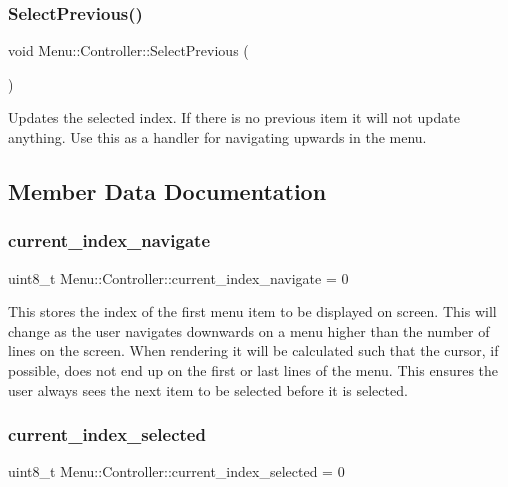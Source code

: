 \subsubsection{\texorpdfstring{Select\+Previous()}{SelectPrevious()}}
{\footnotesize\ttfamily void Menu\+::\+Controller\+::\+Select\+Previous (\begin{DoxyParamCaption}{ }\end{DoxyParamCaption})}

Updates the selected index. If there is no previous item it will not update anything. Use this as a handler for navigating upwards in the menu. 

\subsection{Member Data Documentation}
\hypertarget{class_menu_1_1_controller_a86055b66afbad89c5a0b8a0a1713f9d3}{}\label{class_menu_1_1_controller_a86055b66afbad89c5a0b8a0a1713f9d3} 
\subsubsection{\texorpdfstring{current\+\_\+index\+\_\+navigate}{current\_index\_navigate}}
{\footnotesize\ttfamily uint8\+\_\+t Menu\+::\+Controller\+::current\+\_\+index\+\_\+navigate = 0\hspace{0.3cm}{\ttfamily [private]}}

This stores the index of the first menu item to be displayed on screen. This will change as the user navigates downwards on a menu higher than the number of lines on the screen. When rendering it will be calculated such that the cursor, if possible, does not end up on the first or last lines of the menu. This ensures the user always sees the next item to be selected before it is selected. \hypertarget{class_menu_1_1_controller_ab3bdee08f22d55f8fa0cb9e29bb27d66}{}\label{class_menu_1_1_controller_ab3bdee08f22d55f8fa0cb9e29bb27d66} 
\subsubsection{\texorpdfstring{current\+\_\+index\+\_\+selected}{current\_index\_selected}}
{\footnotesize\ttfamily uint8\+\_\+t Menu\+::\+Controller\+::current\+\_\+index\+\_\+selected = 0\hspace{0.3cm}{\ttfamily [private]}}

